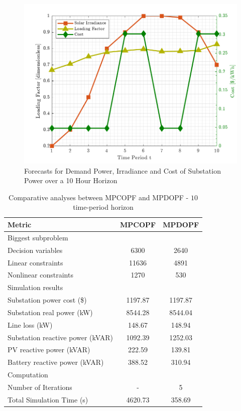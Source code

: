 \documentclass[../../outputs/main.tex]{subfiles}
\begin{document}
\begin{figure}[h!]
    \centering
    \includegraphics[height=0.25\textheight]{../figures/T10-inputCurves/InputCurves_Horizon_10.png}
    \caption{Forecasts for Demand Power, Irradiance and Cost of Substation Power over a 10 Hour Horizon}
    \label{fig:inputCurve-10}
\end{figure}


\begin{table}[h!]
    \centering
    \caption{Comparative analyses between MPCOPF and MPDOPF - $10$ time-period horizon}
    \begin{tabular}{|l|c|c|}
    \hline
    \textbf{Metric} & \textbf{MPCOPF} & \textbf{MPDOPF} \\ \hline
    Biggest subproblem & \multicolumn{2}{c|}{} \\ \hline
    \quad Decision variables & {6300} & {2640} \\ \hline
    \quad Linear constraints & {11636} & {4891} \\ \hline
    \quad Nonlinear constraints & {1270} & {530} \\ \hline
    Simulation results  & \multicolumn{2}{c|}{} \\ \hline
    \quad Substation power cost (\$) & 1197.87 & 1197.87 \\ \hline
    \quad Substation real power (kW) & 8544.28 & 8544.04 \\ \hline
    \quad Line loss (kW) & 148.67 & 148.94 \\ \hline
    \quad Substation reactive power (kVAR) & 1092.39 & 1252.03 \\ \hline
    \quad PV reactive power (kVAR) & 222.59 & 139.81 \\ \hline
    \quad Battery reactive power (kVAR) & 388.52 & 310.94 \\ \hline
    Computation  & \multicolumn{2}{c|}{} \\ \hline
    \quad Number of Iterations & - & 5 \\ \hline
    \quad Total Simulation Time (s) & 4620.73 & 358.69 \\ \hline
    \end{tabular}
    \label{table:opt-10-20-30}
\end{table}
\end{document}
